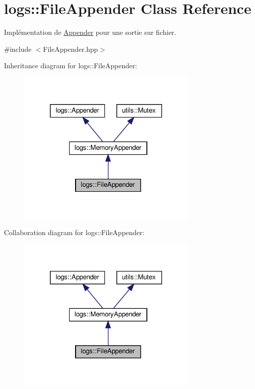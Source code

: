 \hypertarget{classlogs_1_1FileAppender}{}\section{logs\+:\+:File\+Appender Class Reference}
\label{classlogs_1_1FileAppender}


Implémentation de \hyperlink{classlogs_1_1Appender}{Appender} pour une sortie sur fichier.  




{\ttfamily \#include $<$File\+Appender.\+hpp$>$}



Inheritance diagram for logs\+:\+:File\+Appender\+:
\nopagebreak
\begin{figure}[H]
\begin{center}
\leavevmode
\includegraphics[width=248pt]{classlogs_1_1FileAppender__inherit__graph}
\end{center}
\end{figure}


Collaboration diagram for logs\+:\+:File\+Appender\+:
\nopagebreak
\begin{figure}[H]
\begin{center}
\leavevmode
\includegraphics[width=248pt]{classlogs_1_1FileAppender__coll__graph}
\end{center}
\end{figure}
